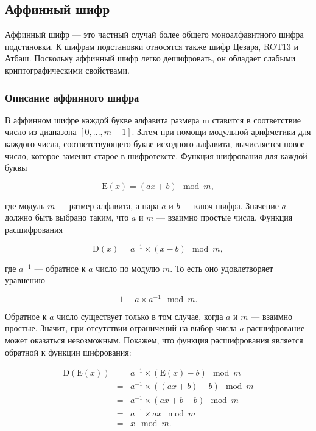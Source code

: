 \subsection{Аффинный шифр}

Аффинный шифр — это частный случай более общего моноалфавитного шифра 
подстановки. К шифрам подстановки относятся также шифр Цезаря, 
ROT13 и Атбаш. Поскольку аффинный шифр легко дешифровать, 
он обладает слабыми криптографическими свойствами.

\subsubsection{Описание аффинного шифра}

В аффинном шифре каждой букве алфавита размера m ставится в 
соответствие число из диапазона $[0, ..., m - 1]$. 
Затем при помощи модульной арифметики для каждого числа, соответствующего 
букве исходного алфавита, вычисляется новое число, которое заменит 
старое в шифротексте. Функция шифрования для каждой буквы

    $$\mbox{E}(x) = (ax + b) \mod{m},$$

где модуль $m$ — размер алфавита, а пара $a$ и $b$ — ключ шифра. Значение 
$a$ должно быть выбрано таким, что $a$ и $m$ — взаимно простые числа. Функция 
расшифрования

    $$\mbox{D}(x) = a^{-1} \times (x - b) \mod{m},$$

где $a^{-1}$ — обратное к $a$ число по модулю $m$. То есть оно удовлетворяет 
уравнению

    $$1 \equiv a \times a^{-1} \mod{m}.$$

Обратное к $a$ число существует только в том случае, когда $a$ и $m$ — взаимно 
простые. Значит, при отсутствии ограничений на выбор числа $a$ расшифрование 
может оказаться невозможным. Покажем, что функция расшифрования является 
обратной к функции шифрования:

\begin{equation}
    \begin{matrix}
        \mbox{D}(\mbox{E}(x)) 
          &= &a^{-1} \times (\mbox{E}(x) - b) \mod{m} \\ 
          &= &a^{-1} \times ((ax + b) - b) \mod{m} \\ 
          &= &a^{-1} \times (ax + b - b) \mod{m} \\ 
          &= &a^{-1} \times ax \mod{m}\\ 
          &= &x \mod{m}. 
    \end{matrix}
\end{equation}

